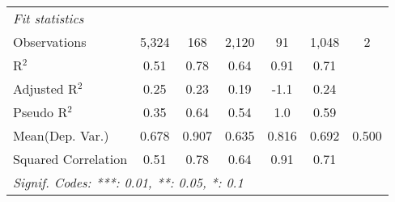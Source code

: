\begin{tabular}{lcccccc}
   \midrule
   \emph{Fit statistics}\\
   Observations                                               & 5,324          & 168           & 2,120         & 91      & 1,048        & 2\\  
   R$^2$                                                      & 0.51           & 0.78          & 0.64          & 0.91    & 0.71         & \\  
   Adjusted R$^2$                                             & 0.25           & 0.23          & 0.19          & -1.1    & 0.24         & \\  
   Pseudo R$^2$                                               & 0.35           & 0.64          & 0.54          & 1.0     & 0.59         & \\  
Mean(Dep. Var.) & 0.678 & 0.907 & 0.635 & 0.816 & 0.692 & 0.500 \\
   Squared Correlation                                        & 0.51           & 0.78          & 0.64          & 0.91    & 0.71         & \\  
   \midrule \midrule
   \multicolumn{7}{l}{\emph{Signif. Codes: ***: 0.01, **: 0.05, *: 0.1}}\\
\end{tabular}
\par\endgroup

